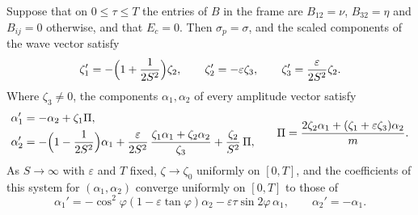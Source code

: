 \begin{lemma}\label{cc:lem:strong-shear}
Suppose that on $0\le\tau\le T$ the entries of $B$ in the frame are
$B_{12}=\nu$, $B_{32}=\eta$ and $B_{ij}=0$ otherwise, and that $E_c=0$.
Then $\sigma_p=\sigma$, and the scaled components of the wave vector
satisfy
\[
 \zeta_1'=-\Bigl(1+\frac1{2S^2}\Bigr)\zeta_2,\qquad
 \zeta_2'=-\varepsilon\zeta_3,\qquad
 \zeta_3'=\frac{\varepsilon}{2S^2}\zeta_2 .
\]
Where $\zeta_3\ne0$, the components $\alpha_1,\alpha_2$ of every
amplitude vector satisfy
\[
 \begin{aligned}
 \alpha_1'&=-\alpha_2+\zeta_1\Pi,\\
 \alpha_2'&=-\Bigl(1-\frac1{2S^2}\Bigr)\alpha_1
   +\frac{\varepsilon}{2S^2}\,\frac{\zeta_1\alpha_1+\zeta_2\alpha_2}{\zeta_3}
   +\frac{\zeta_2}{S^2}\,\Pi,
 \end{aligned}
 \qquad
 \Pi=\frac{2\zeta_2\alpha_1+(\zeta_1+\varepsilon\zeta_3)\alpha_2}m .
\]
As $S\to\infty$ with $\varepsilon$ and $T$ fixed, $\zeta\to\zeta_0$
uniformly on $[0,T]$, and the coefficients of this system for
$(\alpha_1,\alpha_2)$ converge uniformly on $[0,T]$ to those of
\begin{equation}\label{cc:eq:model-system}
 \alpha_1'=-\cos^2\varphi(1-\varepsilon\tan\varphi)\alpha_2
                 -\varepsilon\tau\sin2\varphi\,\alpha_1,
 \qquad \alpha_2'=-\alpha_1 .
\end{equation}
\end{lemma}
